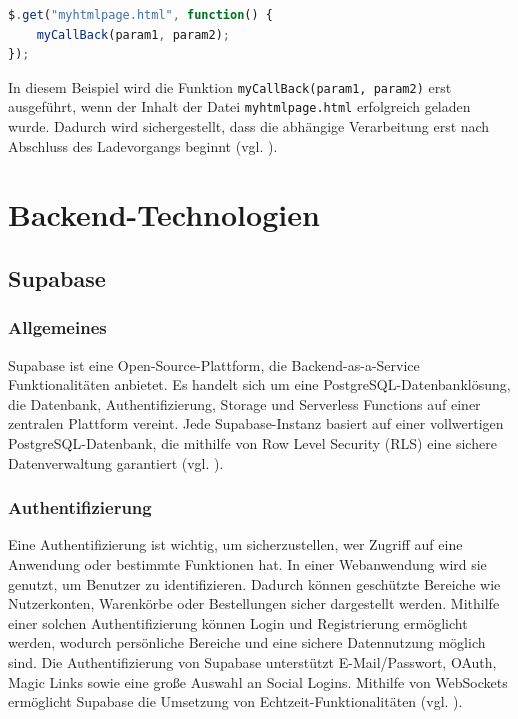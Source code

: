 \documentclass[oneside]{ausarbeitung}
\begin{document}
\begin{lstlisting}[language=JavaScript, caption={Verwendung eines Callbacks in jQuery}]
$.get("myhtmlpage.html", function() { 
    myCallBack(param1, param2); 
});
\end{lstlisting}

In diesem Beispiel wird die Funktion \texttt{myCallBack(param1, param2)} erst ausgeführt, wenn der Inhalt der Datei \texttt{myhtmlpage.html} erfolgreich geladen wurde. Dadurch wird sichergestellt, dass die abhängige Verarbeitung erst nach Abschluss des Ladevorgangs beginnt (vgl. \parencite{jquery_api}).  

\section{Backend-Technologien}
\subsection{Supabase}
\subsubsection{Allgemeines}
Supabase ist eine Open-Source-Plattform, die Backend-as-a-Service Funktionalitäten anbietet. Es handelt sich um eine PostgreSQL-Datenbanklösung, die Datenbank, Authentifizierung, Storage und Serverless Functions auf einer zentralen Plattform vereint. Jede Supabase-Instanz basiert auf einer vollwertigen PostgreSQL-Datenbank, die mithilfe von Row Level Security (RLS) eine sichere Datenverwaltung garantiert (vgl. \parencite{supabase}).

\subsubsection{Authentifizierung}
Eine Authentifizierung ist wichtig, um sicherzustellen, wer Zugriff auf eine Anwendung oder bestimmte Funktionen hat. In einer Webanwendung wird sie genutzt, um Benutzer zu identifizieren. Dadurch können geschützte Bereiche wie Nutzerkonten, Warenkörbe oder Bestellungen sicher dargestellt werden. Mithilfe einer solchen Authentifizierung können Login und Registrierung ermöglicht werden, wodurch persönliche Bereiche und eine sichere Datennutzung möglich sind.
Die Authentifizierung von Supabase unterstützt E-Mail/Passwort, OAuth, Magic Links sowie eine große Auswahl an Social Logins. Mithilfe von WebSockets ermöglicht Supabase die Umsetzung von Echtzeit-Funktionalitäten (vgl. \parencite{supabase}).
\end{document}
